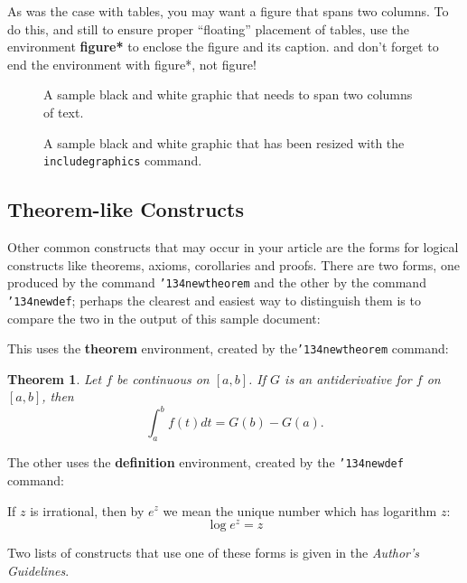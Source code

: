 \documentclass{sig-alternate-05-2015}
\begin{document}
As was the case with tables, you may want a figure
that spans two columns.  To do this, and still to
ensure proper ``floating'' placement of tables, use the environment
\textbf{figure*} to enclose the figure and its caption.
and don't forget to end the environment with
{figure*}, not {figure}!

\begin{figure*}
\centering
\caption{A sample black and white graphic
that needs to span two columns of text.}
\end{figure*}


\begin{figure}
\centering
\caption{A sample black and white graphic that has
been resized with the \texttt{includegraphics} command.}
\vskip -6pt
\end{figure}

\subsection{Theorem-like Constructs}
Other common constructs that may occur in your article are
the forms for logical constructs like theorems, axioms,
corollaries and proofs.  There are
two forms, one produced by the
command \texttt{{\char'134}newtheorem} and the
other by the command \texttt{{\char'134}newdef}; perhaps
the clearest and easiest way to distinguish them is
to compare the two in the output of this sample document:

This uses the \textbf{theorem} environment, created by
the\linebreak\texttt{{\char'134}newtheorem} command:
\newtheorem{theorem}{Theorem}
\begin{theorem}
Let $f$ be continuous on $[a,b]$.  If $G$ is
an antiderivative for $f$ on $[a,b]$, then
\begin{displaymath}\int^b_af(t)dt = G(b) - G(a).\end{displaymath}
\end{theorem}

The other uses the \textbf{definition} environment, created
by the \texttt{{\char'134}newdef} command:
\begin{definition}
If $z$ is irrational, then by $e^z$ we mean the
unique number which has
logarithm $z$: \begin{displaymath}{\log e^z = z}\end{displaymath}
\end{definition}

Two lists of constructs that use one of these
forms is given in the
\textit{Author's  Guidelines}.
 
\end{document}
